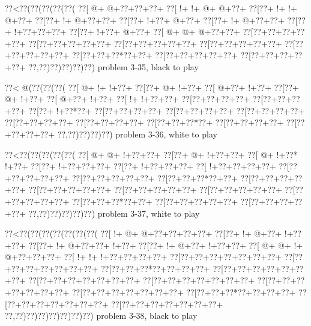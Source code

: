 \vbox{\vbox{\goo
\0??<\0??(\0??(\0??(\0??(\0??(
\0??[\- @+\- @+\0??+\0??+\0??+
\0??[\- !+\- !+\- @+\- @+\0??+
\0??[\0??+\- !+\- !+\- @+\0??+
\0??[\0??+\- !+\- @+\0??+\0??+
\0??[\0??+\- !+\0??+\- @+\0??+
\0??[\0??+\- !+\- @+\0??+\0??+
\0??[\0??+\- !+\0??+\0??+\0??+
\0??[\0??+\- !+\0??+\- @+\0??+
\0??[\- @+\- @+\- @+\0??+\0??+
\0??[\0??+\0??+\0??+\0??+\0??+
\0??[\0??+\0??+\0??+\0??+\0??+
\0??[\0??+\0??+\0??+\0??+\0??+
\0??[\0??+\0??+\0??+\0??+\0??+
\0??[\0??+\0??+\0??+\0??+\0??+
\0??[\0??+\0??+\0??*\0??+\0??+
\0??[\0??+\0??+\0??+\0??+\0??+
\0??[\0??+\0??+\0??+\0??+\0??+
\0??,\0??)\0??)\0??)\0??)\0??)
}
\hfil problem 3-35, black to play\hfil\break
}

\vbox{\vbox{\goo
\0??<\- @(\0??(\0??(\0??(
\0??[\- @+\- !+\- !+\0??+
\0??[\0??+\- @+\- !+\0??+
\0??[\- @+\0??+\- !+\0??+
\0??[\0??+\- @+\- !+\0??+
\0??[\- @+\0??+\- !+\0??+
\0??[\- !+\- !+\0??+\0??+
\0??[\0??+\0??+\0??+\0??+
\0??[\0??+\0??+\0??+\0??+
\0??[\0??+\- !+\0??*\0??+
\0??[\0??+\0??+\0??+\0??+
\0??[\0??+\0??+\0??+\0??+
\0??[\0??+\0??+\0??+\0??+
\0??[\0??+\0??+\0??+\0??+
\0??[\0??+\0??+\0??+\0??+
\0??[\0??+\0??+\0??*\0??+
\0??[\0??+\0??+\0??+\0??+
\0??[\0??+\0??+\0??+\0??+
\0??,\0??)\0??)\0??)\0??)
}
\hfil problem 3-36, white to play\hfil\break
}

\vbox{\vbox{\goo
\0??<\0??(\0??(\0??(\0??(\0??(
\0??[\- @+\- @+\- !+\0??+\0??+
\0??[\0??+\- @+\- !+\0??+\0??+
\0??[\- @+\- !+\0??*\- !+\0??+
\0??[\0??+\- !+\0??+\0??+\0??+
\0??[\0??+\- !+\0??+\0??+\0??+
\0??[\- !+\0??+\0??+\0??+\0??+
\0??[\0??+\0??+\0??+\0??+\0??+
\0??[\0??+\0??+\0??+\0??+\0??+
\0??[\0??+\0??+\0??*\0??+\0??+
\0??[\0??+\0??+\0??+\0??+\0??+
\0??[\0??+\0??+\0??+\0??+\0??+
\0??[\0??+\0??+\0??+\0??+\0??+
\0??[\0??+\0??+\0??+\0??+\0??+
\0??[\0??+\0??+\0??+\0??+\0??+
\0??[\0??+\0??+\0??*\0??+\0??+
\0??[\0??+\0??+\0??+\0??+\0??+
\0??[\0??+\0??+\0??+\0??+\0??+
\0??,\0??)\0??)\0??)\0??)\0??)
}
\hfil problem 3-37, white to play\hfil\break
}

\vbox{\vbox{\goo
\0??<\0??(\0??(\0??(\0??(\0??(\0??(\0??(
\0??[\- !+\- @+\- @+\0??+\0??+\0??+\0??+
\0??[\0??+\- !+\- @+\0??+\- !+\0??+\0??+
\0??[\0??+\- !+\- @+\0??+\0??+\- !+\0??+
\0??[\0??+\- !+\- @+\0??+\- !+\0??+\0??+
\0??[\- @+\- @+\- !+\- @+\0??+\0??+\0??+
\0??[\- !+\- !+\- !+\0??+\0??+\0??+\0??+
\0??[\0??+\0??+\0??+\0??+\0??+\0??+\0??+
\0??[\0??+\0??+\0??+\0??+\0??+\0??+\0??+
\0??[\0??+\0??+\0??*\0??+\0??+\0??+\0??+
\0??[\0??+\0??+\0??+\0??+\0??+\0??+\0??+
\0??[\0??+\0??+\0??+\0??+\0??+\0??+\0??+
\0??[\0??+\0??+\0??+\0??+\0??+\0??+\0??+
\0??[\0??+\0??+\0??+\0??+\0??+\0??+\0??+
\0??[\0??+\0??+\0??+\0??+\0??+\0??+\0??+
\0??[\0??+\0??+\0??*\0??+\0??+\0??+\0??+
\0??[\0??+\0??+\0??+\0??+\0??+\0??+\0??+
\0??[\0??+\0??+\0??+\0??+\0??+\0??+\0??+
\0??,\0??)\0??)\0??)\0??)\0??)\0??)\0??)
}
\hfil problem 3-38, black to play\hfil\break
}

